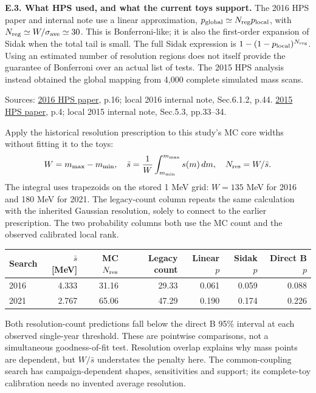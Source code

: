 \documentclass[11pt]{article}
\begin{document}
\textbf{E.3. What HPS used, and what the current toys support.} The 2016 HPS paper and internal note use a linear approximation, $p_{\rm global}\simeq N_{\rm reg}p_{\rm local}$, with $N_{\rm reg}\simeq W/\sigma_{\rm ave}\simeq30$. This is Bonferroni-like; it is also the first-order expansion of Sidak when the total tail is small. The full Sidak expression is $1-(1-p_{\rm local})^{N_{\rm reg}}$. Using an estimated number of resolution regions does not itself provide the guarantee of Bonferroni over an actual list of tests. The 2015 HPS analysis instead obtained the global mapping from 4,000 complete simulated mass scans.\par
{\small Sources: \href{https://arxiv.org/pdf/2212.10629}{2016 HPS paper}, p.16; local 2016 internal note, Sec.6.1.2, p.44. \href{https://arxiv.org/pdf/1807.11530}{2015 HPS paper}, p.4; local 2015 internal note, Sec.5.3, pp.33--34.}\par

Apply the historical resolution prescription to this study's MC core widths without fitting it to the toys:
\[
 W=m_{\max}-m_{\min},\quad \bar s=\frac{1}{W}\int_{m_{\min}}^{m_{\max}}s(m)\,dm,
 \quad N_{\rm res}=W/\bar s.
\]
The integral uses trapezoids on the stored 1 MeV grid: $W=135$ MeV for 2016 and 180 MeV for 2021. The legacy-count column repeats the same calculation with the inherited Gaussian resolution, solely to connect to the earlier prescription. The two probability columns both use the MC count and the observed calibrated local rank.

\begin{center}\small\setlength{\tabcolsep}{4pt}\begin{tabular}{lrrrrrr}\toprule
Search & $\bar s$ [MeV] & MC $N_{\rm res}$ & Legacy count & Linear $p$ & Sidak $p$ & Direct B $p$\\\midrule
2016 & 4.333 & 31.16 & 29.33 & 0.061 & 0.059 & 0.088\\
2021 & 2.767 & 65.06 & 47.29 & 0.190 & 0.174 & 0.226\\
\bottomrule\end{tabular}\end{center}

Both resolution-count predictions fall below the direct B 95\% interval at each observed single-year threshold. These are pointwise comparisons, not a simultaneous goodness-of-fit test. Resolution overlap explains why mass points are dependent, but $W/\bar s$ understates the penalty here. The common-coupling search has campaign-dependent shapes, sensitivities and support; its complete-toy calibration needs no invented average resolution.
\end{document}
